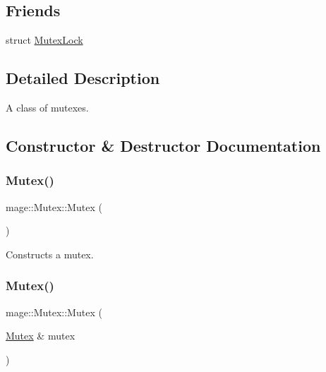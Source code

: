 \subsection*{Friends}
\begin{DoxyCompactItemize}
\item 
struct \hyperlink{classmage_1_1_mutex_a058473d070063e5098732f355f432bd9}{Mutex\+Lock}
\end{DoxyCompactItemize}


\subsection{Detailed Description}
A class of mutexes. 

\subsection{Constructor \& Destructor Documentation}
\hypertarget{classmage_1_1_mutex_ab22db01311271ef54642b10ea53dfd8a}{}\label{classmage_1_1_mutex_ab22db01311271ef54642b10ea53dfd8a} 
\subsubsection{\texorpdfstring{Mutex()}{Mutex()}\hspace{0.1cm}{\footnotesize\ttfamily [1/2]}}
{\footnotesize\ttfamily mage\+::\+Mutex\+::\+Mutex (\begin{DoxyParamCaption}{ }\end{DoxyParamCaption})\hspace{0.3cm}{\ttfamily [private]}}

Constructs a mutex. \hypertarget{classmage_1_1_mutex_a0f38f170668eb1fe3c2f110738edc39e}{}\label{classmage_1_1_mutex_a0f38f170668eb1fe3c2f110738edc39e} 
\subsubsection{\texorpdfstring{Mutex()}{Mutex()}\hspace{0.1cm}{\footnotesize\ttfamily [2/2]}}
{\footnotesize\ttfamily mage\+::\+Mutex\+::\+Mutex (\begin{DoxyParamCaption}\item[{\hyperlink{classmage_1_1_mutex}{Mutex} \&}]{mutex }\end{DoxyParamCaption})\hspace{0.3cm}{\ttfamily [private]}}

